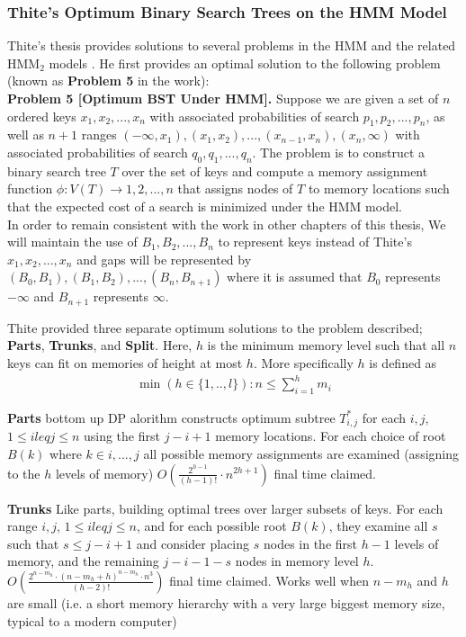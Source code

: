 \documentclass[]{beamer}
\theoremstyle{plain}
\begin{document}
\begin{frame} \frametitle{Thite's Optimum Binary Search Trees on the HMM Model}

Thite's thesis provides solutions to several problems in the HMM and the related HMM$_2$ models \cite{thite2008optimum}. He first provides an optimal solution to the following problem (known as \textbf{Problem 5} in the work):\\


\noindent \textbf{Problem 5 [Optimum BST Under HMM].}  \cite{thite2008optimum} Suppose we are given a set of $n$ ordered keys $x_1, x_2, ..., x_n$ with associated probabilities of search $p_1, p_2, ..., p_n$, as well as $n+1$ ranges $(- \infty, x_1), (x_1, x_2), ..., (x_{n-1}, x_n), (x_n, \infty)$ with associated probabilities of search $q_0, q_1, ..., q_n$. The problem is to construct a binary search tree $T$ over the set of keys and compute a memory assignment function $\phi : V (T) \rightarrow {1, 2, ..., n}$ that assigns nodes of $T$ to memory locations such that the expected cost of a search is minimized under the HMM model. \\

In order to remain consistent with the work in other chapters of this thesis, We will maintain the use of $B_1, B_2, ..., B_n$ to represent keys instead of Thite's $x_1, x_2, ..., x_n$ and gaps will be represented by $(B_0, B_1), (B_1, B_2), ..., (B_n, B_{n+1})$ where it is assumed that $B_0$ represents $- \infty$ and $B_{n+1}$ represents $\infty$.

Thite provided three separate optimum solutions to the problem described; \textbf{Parts}, \textbf{Trunks}, and \textbf{Split}. Here, $h$ is the minimum memory level such that all $n$ keys can fit on memories of height at most $h$. More specifically $h$ is defined as \\
\begin{align*}
\min(h \in \{1,..,l\} ): n \leq \sum_{i = 1}^{h}m_i
\end{align*}

\textbf{Parts}
bottom up DP alorithm
constructs optimum subtree $T^{*}_{i,j}$ for each $i,j$, $1 \leq i leq j \leq n$ using the first $j-i+1$ memory locations.
For each choice of root $B(k)$ where $k \in {i, ..., j}$ all possible memory assignments are examined (assigning to the $h$ levels of memory)
$O(\frac{2^{h-1}}{(h-1)!}\cdot n^{2h+1})$ final time claimed.

\textbf{Trunks}
Like parts, building optimal trees over larger subsets of keys.
For each range $i,j$, $1 \leq i leq j \leq n$, and for each possible root $B(k)$, they examine all $s$ such that $s \leq j-i+1$ and consider placing $s$ nodes in the first $h-1$ levels of memory, and the remaining $j-i-1-s$ nodes in memory level $h$.
$O(\frac{2^{n-m_h}\cdot (n-m_h+h)^{n-m_h}\cdot n^3}{(h-2)!})$ final time claimed. Works well when $n-m_h$ and $h$ are small (i.e. a short memory hierarchy with a very large biggest memory size, typical to a modern computer)


\end{frame}
\end{document}
